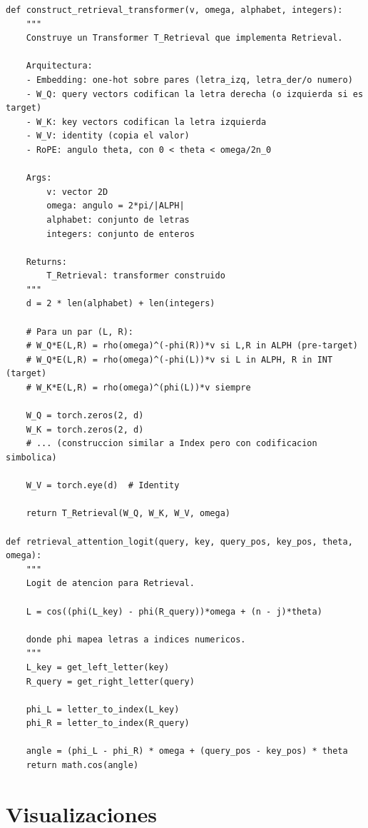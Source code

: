 \documentclass[12pt,a4paper]{report}
\begin{document}
\begin{lstlisting}
def construct_retrieval_transformer(v, omega, alphabet, integers):
    """
    Construye un Transformer T_Retrieval que implementa Retrieval.
    
    Arquitectura:
    - Embedding: one-hot sobre pares (letra_izq, letra_der/o numero)
    - W_Q: query vectors codifican la letra derecha (o izquierda si es target)
    - W_K: key vectors codifican la letra izquierda
    - W_V: identity (copia el valor)
    - RoPE: angulo theta, con 0 < theta < omega/2n_0
    
    Args:
        v: vector 2D
        omega: angulo = 2*pi/|ALPH|
        alphabet: conjunto de letras
        integers: conjunto de enteros
    
    Returns:
        T_Retrieval: transformer construido
    """
    d = 2 * len(alphabet) + len(integers)
    
    # Para un par (L, R):
    # W_Q*E(L,R) = rho(omega)^(-phi(R))*v si L,R in ALPH (pre-target)
    # W_Q*E(L,R) = rho(omega)^(-phi(L))*v si L in ALPH, R in INT (target)
    # W_K*E(L,R) = rho(omega)^(phi(L))*v siempre
    
    W_Q = torch.zeros(2, d)
    W_K = torch.zeros(2, d)
    # ... (construccion similar a Index pero con codificacion simbolica)
    
    W_V = torch.eye(d)  # Identity
    
    return T_Retrieval(W_Q, W_K, W_V, omega)

def retrieval_attention_logit(query, key, query_pos, key_pos, theta, omega):
    """
    Logit de atencion para Retrieval.
    
    L = cos((phi(L_key) - phi(R_query))*omega + (n - j)*theta)
    
    donde phi mapea letras a indices numericos.
    """
    L_key = get_left_letter(key)
    R_query = get_right_letter(query)
    
    phi_L = letter_to_index(L_key)
    phi_R = letter_to_index(R_query)
    
    angle = (phi_L - phi_R) * omega + (query_pos - key_pos) * theta
    return math.cos(angle)
\end{lstlisting}

\section{Visualizaciones}
\label{sec:visualizaciones}
\end{document}
